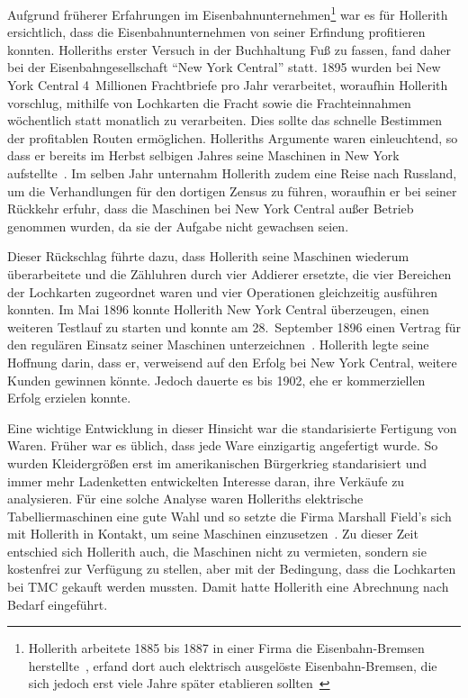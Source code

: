 \documentclass[parskip=half]{scrartcl}
\begin{document}
Aufgrund früherer Erfahrungen im Eisenbahnunternehmen\footnote{Hollerith
arbeitete 1885 bis 1887 in einer Firma die Eisenbahn-Bremsen
herstellte~\cite{heide2009punched}, erfand dort auch elektrisch
ausgelöste Eisenbahn-Bremsen, die sich jedoch erst viele Jahre später
etablieren sollten~\cite{austrian1982herman}} war es für Hollerith
ersichtlich, dass die Eisenbahnunternehmen von seiner Erfindung profitieren
konnten. Holleriths erster Versuch in der Buchhaltung Fuß zu fassen, fand daher bei der
Eisenbahngesellschaft \enquote{New York Central} statt. 1895 wurden bei New York
Central 4~Millionen Frachtbriefe pro Jahr verarbeitet, woraufhin Hollerith
vorschlug, mithilfe von Lochkarten die Fracht sowie die Frachteinnahmen wöchentlich statt monatlich zu verarbeiten. Dies sollte das schnelle Bestimmen der profitablen Routen ermöglichen. Holleriths Argumente waren einleuchtend, so
dass er bereits im Herbst selbigen Jahres seine Maschinen in New York
aufstellte~\cite{austrian1982herman}. Im selben Jahr unternahm Hollerith zudem
eine Reise nach Russland, um die Verhandlungen für den dortigen Zensus zu führen,
woraufhin er bei seiner Rückkehr erfuhr, dass die Maschinen bei New York Central
außer Betrieb genommen wurden, da sie der Aufgabe nicht gewachsen seien.

Dieser Rückschlag führte dazu, dass Hollerith seine Maschinen wiederum
überarbeitete und die Zähluhren durch vier Addierer ersetzte, die vier
Bereichen der Lochkarten zugeordnet waren und vier Operationen gleichzeitig
ausführen konnten. Im Mai 1896 konnte Hollerith New York Central überzeugen,
einen weiteren Testlauf zu starten und konnte am 28.~September 1896 einen
Vertrag für den regulären Einsatz seiner Maschinen
unterzeichnen~\cite{austrian1982herman}. Hollerith legte seine Hoffnung darin, dass er, verweisend auf den Erfolg bei New York
Central, weitere Kunden gewinnen könnte. Jedoch dauerte es bis 1902, ehe er
kommerziellen Erfolg erzielen konnte.

Eine wichtige Entwicklung in dieser Hinsicht war die standarisierte Fertigung
von Waren. Früher war es üblich, dass jede Ware einzigartig angefertigt wurde.
So wurden Kleidergrößen erst im amerikanischen Bürgerkrieg standarisiert und immer mehr Ladenketten entwickelten Interesse daran, ihre Verkäufe zu analysieren. Für eine solche
Analyse waren Holleriths elektrische Tabelliermaschinen eine gute Wahl und so
setzte die Firma Marshall Field's sich mit Hollerith in Kontakt, um seine
Maschinen einzusetzen~\cite{austrian1982herman}. Zu dieser Zeit entschied sich Hollerith auch, die Maschinen nicht zu vermieten,
sondern sie kostenfrei zur Verfügung zu stellen, aber mit der Bedingung, dass die
Lochkarten bei TMC gekauft werden mussten. Damit hatte Hollerith eine Abrechnung nach
Bedarf eingeführt.
\end{document}
